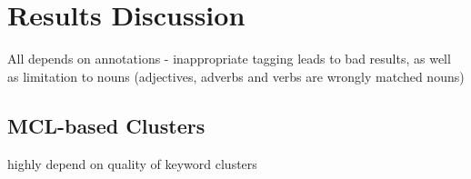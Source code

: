 %
\section{Results Discussion}
\label{sec_discussion}


All depends on annotations - inappropriate tagging leads to bad results, as well as limitation to nouns (adjectives, adverbs and verbs are wrongly matched nouns) \\

\subsection{MCL-based Clusters}
highly depend on quality of keyword clusters